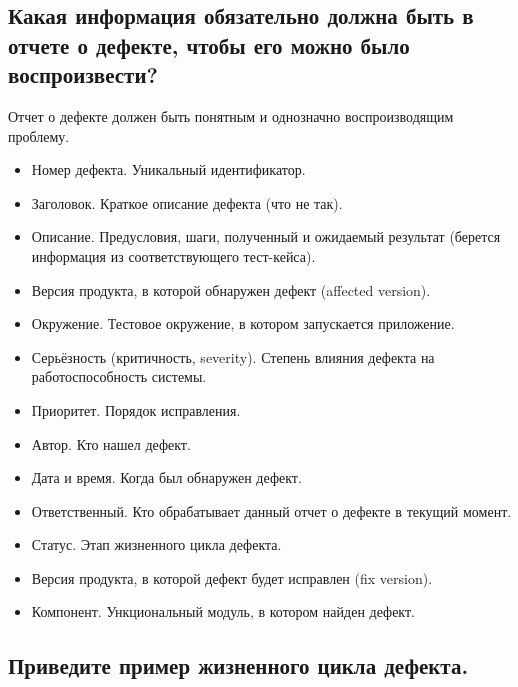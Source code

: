\subsection{Какая информация обязательно должна быть в отчете о дефекте, чтобы
его можно было воспроизвести?}

Отчет о дефекте должен быть понятным и однозначно воспроизводящим проблему.

\begin{itemize}
    \item Номер дефекта. Уникальный идентификатор.

    \item Заголовок. Краткое описание дефекта (что не так).

    \item Описание. Предусловия, шаги, полученный и ожидаемый результат
        (берется информация из соответствующего тест-кейса).

    \item Версия продукта, в которой обнаружен дефект (affected version).

    \item Окружение. Тестовое окружение, в котором запускается приложение.

    \item Серьёзность (критичность, severity). Степень влияния дефекта на
        работоспособность системы. 

    \item Приоритет. Порядок исправления.

    \item Автор. Кто нашел дефект.

    \item Дата и время. Когда был обнаружен дефект.

    \item Ответственный. Кто обрабатывает данный отчет о дефекте в текущий
        момент.

    \item Статус. Этап жизненного цикла дефекта.

    \item Версия продукта, в которой дефект будет исправлен (fix version).

    \item Компонент. Ункциональный модуль, в котором найден дефект.
\end{itemize}

\subsection{Приведите пример жизненного цикла дефекта.}

